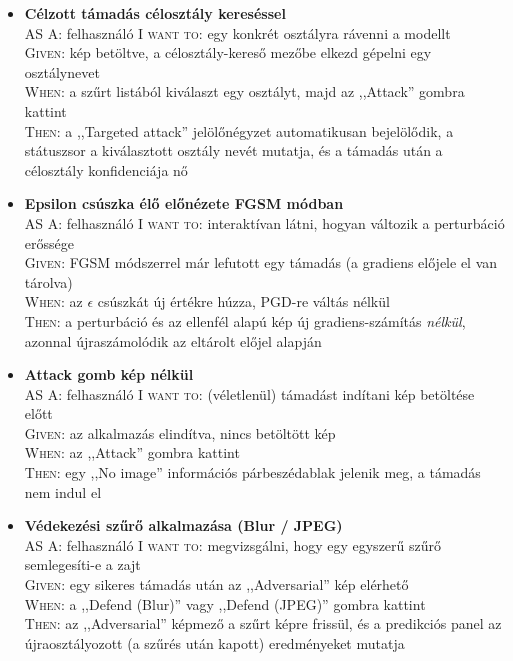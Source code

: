 \begin{itemize}
  \item \textbf{Célzott támadás célosztály kereséssel}\\ 
    AS A: felhasználó \textsc{I want to}: egy konkrét osztályra rávenni a modellt\\ 
    \textsc{Given}: kép betöltve, a célosztály-kereső mezőbe elkezd gépelni egy osztálynevet\\ 
    \textsc{When}: a szűrt listából kiválaszt egy osztályt, majd az ,,Attack'' gombra kattint\\ 
    \textsc{Then}: a ,,Targeted attack'' jelölőnégyzet automatikusan bejelölődik, a státuszsor a kiválasztott osztály nevét 
    mutatja, és a támadás után a célosztály konfidenciája nő 

  \item \textbf{Epsilon csúszka élő előnézete FGSM módban}\\ 
    AS A: felhasználó \textsc{I want to}: interaktívan látni, hogyan változik a perturbáció erőssége\\ 
    \textsc{Given}: FGSM módszerrel már lefutott egy támadás (a gradiens előjele el van tárolva)\\ 
    \textsc{When}: az $\epsilon$ csúszkát új értékre húzza, PGD-re váltás nélkül\\ 
    \textsc{Then}: a perturbáció és az ellenfél alapú kép új gradiens-számítás \emph{nélkül}, azonnal újraszámolódik az eltárolt 
    előjel alapján 

  \item \textbf{Attack gomb kép nélkül}\\ 
    AS A: felhasználó \textsc{I want to}: (véletlenül) támadást indítani kép betöltése előtt\\ 
    \textsc{Given}: az alkalmazás elindítva, nincs betöltött kép\\ 
    \textsc{When}: az ,,Attack'' gombra kattint\\ 
    \textsc{Then}: egy ,,No image'' információs párbeszédablak jelenik meg, a támadás nem indul el 

  \item \textbf{Védekezési szűrő alkalmazása (Blur / JPEG)}\\ 
    AS A: felhasználó \textsc{I want to}: megvizsgálni, hogy egy egyszerű szűrő semlegesíti-e a zajt\\ 
    \textsc{Given}: egy sikeres támadás után az ,,Adversarial'' kép elérhető\\ 
    \textsc{When}: a ,,Defend (Blur)'' vagy ,,Defend (JPEG)'' gombra kattint\\ 
    \textsc{Then}: az ,,Adversarial'' képmező a szűrt képre frissül, és a predikciós panel az újraosztályozott (a szűrés után 
    kapott) eredményeket mutatja 


\end{itemize}
